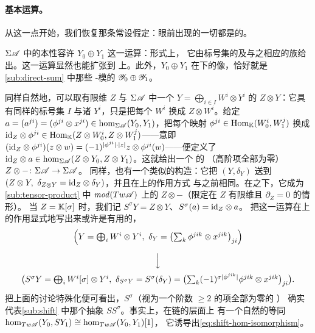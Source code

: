 \paragraph{基本运算。}\label{sub:basic-operations}
从这一点开始，我们恢复那条常设假定：眼前出现的一切都是\trCunital{}的。

$\Sigma\mathscr{A}$ 中\trObject{}的本性容许\trDirectSum{} $Y_0\oplus Y_1$ 这一运算：形式上，
它由标号集的\trDisjointUnion{}及与之相应的族给出。这一运算显然也能扩张到%
\trTwistedComplex{}上。此外，$Y_0\oplus Y_1$ 在\trYonedaEmbedding{}下的像，恰好就是
\cref{sub:direct-sum} 中那些 \trAinfty-模的\trDirectSum{} $\mathscr{Y}_0\oplus\mathscr{Y}_1$。

同样自然地，可以取有限维\trGraded\trVectorSpace{} $Z$ 与 $\Sigma\mathscr{A}$ 中一个\trObject{}%
$Y=\bigoplus_{i\in I}W^i\otimes Y^i$ 的\trTensorProduct{} $Z\otimes Y$：它具有同样的标号集
$I$ 与诸\trObject{} $Y^i$，只是把每个 $W^i$ 换成 $Z\otimes W^i$。给定
$a=(a^{ji})=(\phi^{ji}\otimes x^{ji})\in\hom_{\Sigma\mathscr{A}}(Y_0,Y_1)$，把每个\trLinear{}映射
$\phi^{ji}\in\operatorname{Hom}_{\mathbb{K}}(W_0^i,W_1^j)$ 换成\trGraded\trTensorProduct{}%
$\mathrm{id}_Z\otimes\phi^{ji}\in\operatorname{Hom}_{\mathbb{K}}(Z\otimes W_0^i,Z\otimes W_1^j)$——意即
$(\mathrm{id}_Z\otimes\phi^{ji})(z\otimes w)=(-1)^{|\phi^{ji}|\cdot|z|}z\otimes\phi^{ji}(w)$——便定义了
$\mathrm{id}_Z\otimes a\in\hom_{\Sigma\mathscr{A}}(Z\otimes Y_0,Z\otimes Y_1)$。这就给出一个%
\trNonunital{}的 \trAFunctor{}（高阶项全部为零）$Z\otimes-\colon\Sigma\mathscr{A}\to\Sigma\mathscr{A}$。
同样，\trTwistedComplex{}也有一个类似的构造：它把 $(Y,\delta_Y)$ 送到
$(Z\otimes Y,\ \delta_{Z\otimes Y}=\mathrm{id}_Z\otimes\delta_Y)$，并且在\trMorphism{}上的作用方式
与之前相同。在\trYonedaEmbedding{}之下，它成为\cref{sub:tensor-product} 中
$\mathit{mod}(Tw\mathscr{A})$ 上的\trFunctor{} $Z\otimes-$（限定在 $Z$ 有限维且 $\partial_Z=0$
的情形）。
当 $Z=\mathbb{K}[\sigma]$ 时，我们记 $S^{\sigma}Y=Z\otimes Y$、$S^{\sigma}(a)=\mathrm{id}_Z\otimes a$。
把这一运算在\trTwistedComplex{}上的作用显式地写出来或许是有用的，
\begin{equation*}
\begin{array}{c}
\Bigl(Y=\bigoplus_i W^i\otimes Y^i,\ \delta_Y=\bigl(\sum_k\phi^{jik}\otimes x^{jik}\bigr)_{ji}\Bigr)\\[3ex]
\Big\downarrow\\[2ex]
\bigl(S^{\sigma}Y=\bigoplus_i W^i[\sigma]\otimes Y^i,\ \delta_{S^{\sigma}Y}=S^{\sigma}(\delta_Y)
=\bigl(\textstyle\sum_k(-1)^{\sigma|\phi^{jik}|}\phi^{jik}\otimes x^{jik}\bigr)_{ji}\bigr).
\end{array}
\end{equation*}
把上面的讨论特殊化便可看出，$S^{\sigma}$（视为一个阶数 $\ge 2$ 的项全部为零的 \trAFunctor）
确实代表\cref{sub:shift} 中那个抽象\trShiftFunctor{} $SS^{\sigma}$。事实上，在链的层面上
有一个自然的等同 $\hom_{Tw\mathscr{A}}(Y_0,SY_1)\cong\hom_{Tw\mathscr{A}}(Y_0,Y_1)[1]$，
它诱导出\eqref{eq:shift-hom-isomorphism}。

